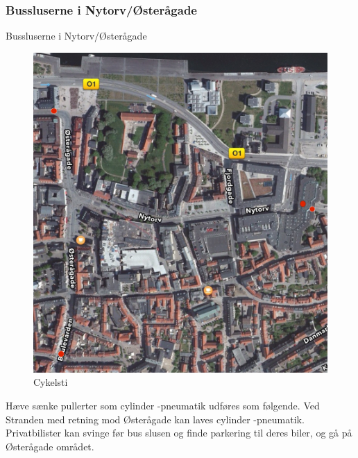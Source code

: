 \subsubsection{Bussluserne i Nytorv/Østerågade}
\label{subs:buslusnytorv}
{Bussluserne i Nytorv/Østerågade}
\label{sub:}
\begin{figure}[htbp]
  \centering
  \begin{adjustbox}{max width=\textwidth}
    \includegraphics{figures/Billederogfigur/2.jpg}
 \end{adjustbox}
  \caption{Cykelsti}
   \label{fig:cykelsti}
\end{figure}
Hæve sænke pullerter som cylinder -pneumatik udføres som følgende. Ved Stranden med retning mod Østerågade kan laves cylinder -pneumatik. Privatbilister kan svinge før bus slusen og finde parkering til deres biler, og gå på Østerågade området.
